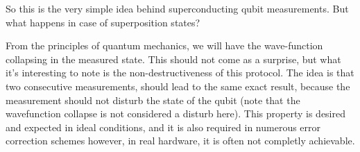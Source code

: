 So this is the very simple idea behind superconducting qubit measurements.
But what happens in case of superposition states?

From the principles of quantum mechanics, we will have the wave-function collapsing in the measured state. This should not come as a surprise, but what it's interesting to note is the non-destructiveness of this protocol.
The idea is that two consecutive measurements, should lead to the same exact result, because the measurement should not disturb the state of the qubit (note that the wavefunction collapse is not considered a disturb here).
This property is desired and expected in ideal conditions, and it is also required in numerous error correction schemes however, in real hardware, it is often not completly achievable.




